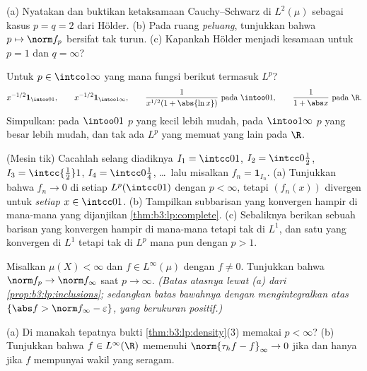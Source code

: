 \begin{exercise}[$\star$]\label{exo:b3:lp:1}
(a) Nyatakan dan buktikan ketaksamaan Cauchy--Schwarz di
$L^2(\mu)$ sebagai kasus $p = q = 2$ dari Hölder.
(b) Pada ruang \emph{peluang}, tunjukkan bahwa $p \mapsto \norm f_p$
bersifat tak turun.
(c) Kapankah Hölder menjadi kesamaan untuk $p = 1$ dan $q = \infty$?
\end{exercise}

\begin{exercise}[$\star$]\label{exo:b3:lp:2}
Untuk $p \in \intco1\infty$ yang mana fungsi berikut termasuk
$L^p$?
\[
x^{-1/2}\mathbf 1_{\intoo01},\qquad
x^{-1/2}\mathbf 1_{\intoo1\infty},\qquad
\frac{1}{x^{1/2}(1 + \abs{\ln x})}\ \text{pada } \intoo01,
\qquad
\frac1{1 + \abs x}\ \text{pada } \R .
\]
Simpulkan: pada $\intoo01$ $p$ yang kecil lebih mudah, pada
$\intoo1\infty$ $p$ yang besar lebih mudah, dan tak ada $L^p$ yang memuat
yang lain pada $\R$.
\end{exercise}

\begin{exercise}[$\star\star$]\label{exo:b3:lp:3}
(Mesin tik) Cacahlah selang diadiknya $I_1 =
\intcc01$, $I_2 = \intcc0{\frac12}$, $I_3 = \intcc{\frac12}1$,
$I_4 = \intcc0{\frac14}$, \dots\ lalu misalkan $f_n = \mathbf
1_{I_n}$.
(a) Tunjukkan bahwa $f_n \to 0$ di setiap $L^p(\intcc01)$ dengan $p < \infty$,
tetapi $(f_n(x))$ divergen untuk \emph{setiap} $x \in \intcc01$.
(b) Tampilkan subbarisan yang konvergen hampir di mana-mana yang dijanjikan
\cref{thm:b3:lp:complete}.
(c) Sebaliknya berikan sebuah barisan yang konvergen hampir di mana-mana tetapi tak di
$L^1$, dan satu yang konvergen di $L^1$ tetapi tak di $L^p$ mana pun dengan $p > 1$.
\end{exercise}

\begin{exercise}[$\star\star$]\label{exo:b3:lp:4}
Misalkan $\mu(X) < \infty$ dan $f \in L^\infty(\mu)$ dengan $f \neq 0$.
Tunjukkan bahwa $\norm f_p \to \norm f_\infty$ saat $p \to \infty$.
\emph{(Batas atasnya lewat (a) dari \cref{prop:b3:lp:inclusions};
sedangkan batas bawahnya dengan mengintegralkan atas $\{\abs f > \norm f_\infty -
\varepsilon\}$, yang berukuran positif.)}
\end{exercise}

\begin{exercise}[$\star\star$]\label{exo:b3:lp:5}
(a) Di manakah tepatnya bukti
\cref{thm:b3:lp:density}(3) memakai $p < \infty$?
(b) Tunjukkan bahwa $f \in L^\infty(\R)$ memenuhi $\norm{\tau_hf -
f}_\infty \to 0$ jika dan hanya jika $f$ mempunyai wakil yang 
seragam.
\end{exercise}

